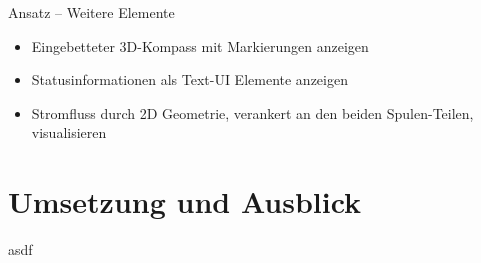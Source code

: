 \begin{frame}[fragile]{Ansatz -- Weitere Elemente }
\begin{itemize}
\item Eingebetteter 3D-Kompass mit Markierungen anzeigen
\item Statusinformationen als Text-UI Elemente anzeigen
\item Stromfluss durch 2D Geometrie, verankert an den beiden Spulen-Teilen, visualisieren
\end{itemize}
\end{frame}


\part{Umsetzung und Ausblick}
\label{part:practice}

\begin{frame}[fragile]{}
asdf
\end{frame}
